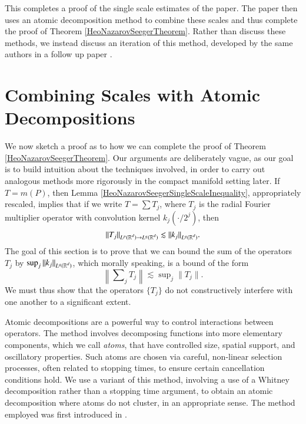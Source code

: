 This completes a proof of the single scale estimates of the paper. The paper then uses an atomic decomposition method to combine these scales and thus complete the proof of Theorem \ref{HeoNazarovSeegerTheorem}. Rather than discuss these methods, we instead discuss an iteration of this method, developed by the same authors in a follow up paper \cite{HeoandNazarovandSeeger2}.

\section{Combining Scales with Atomic Decompositions} \label{sec:combiningscaleswithatomicdecompositions}

We now sketch a proof as to how we can complete the proof of Theorem \ref{HeoNazarovSeegerTheorem}. Our arguments are deliberately vague, as our goal is to build intuition about the techniques involved, in order to carry out analogous methods more rigorously in the compact manifold setting later. If $T = m(P)$, then Lemma \ref{HeoNazarovSeegerSingleScaleInequality}, appropriately rescaled, implies that if we write $T = \sum T_j$, where $T_j$ is the radial Fourier multiplier operator with convolution kernel $k_j(\cdot/2^j)$, then
%
\begin{equation} \label{individualscaleoperatorbound}
    \| T_j \|_{L^p(\operatorname{\mathbb{R}}^d) \to L^q(\operatorname{\mathbb{R}}^d)} \lesssim \| k_j \|_{L^q(\operatorname{\mathbb{R}}^d)}.
\end{equation}
%
The goal of this section is to prove that we can bound the sum of the operators $T_j$ by $\sup_j \| k_j \|_{L^q(\operatorname{\mathbb{R}}^d)}$, which morally speaking, is a bound of the form
%
\begin{equation}
  \left\| \sum\nolimits_j T_j \right\| \lesssim \sup\nolimits_j \| T_j \|.
\end{equation}
%
We must thus show that the operators $\{ T_j \}$ do not constructively interfere with one another to a significant extent.

Atomic decompositions are a powerful way to control interactions between operators. The method involves decomposing functions into more elementary components, which we call \emph{atoms}, that have controlled size, spatial support, and oscillatory properties. Such atoms are chosen via careful, non-linear selection processes, often related to stopping times, to ensure certain cancellation conditions hold. We use a variant of this method, involving a use of a Whitney decomposition rather than a stopping time argument, to obtain an atomic decomposition where atoms do not cluster, in an appropriate sense. The method employed was first introduced in \cite{SeegerRemarks}.

